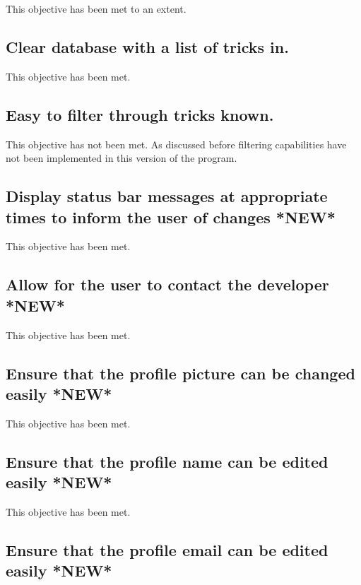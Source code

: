 This objective has been met to an extent.



\subsection{Clear database with a list of tricks in.} %

This objective has been met.


\subsection{ Easy to filter through tricks known.}

This objective has not been met. As discussed before filtering capabilities have not been implemented in this version of the program.



\subsection {Display status bar messages at appropriate times to inform the user of changes *NEW*}

This objective has been met.



\subsection {Allow for the user to contact the developer *NEW*}

This objective has been met.



\subsection {Ensure that the profile picture can be changed easily *NEW*} %

This objective has been met.



\subsection {Ensure that the profile name can be edited easily *NEW*} %

This objective has been met.




\subsection {Ensure that the profile email can be edited easily *NEW*} %

